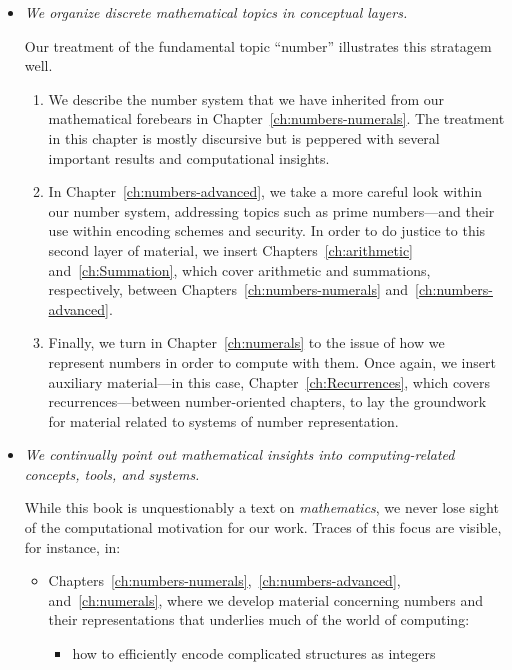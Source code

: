 \begin{itemize}
\item
{\em We organize discrete mathematical topics in conceptual layers.}

Our treatment of the fundamental topic ``number'' illustrates this
stratagem well.
  \begin{enumerate}
  \item
We describe the number system that we have inherited from our
mathematical forebears in Chapter~\ref{ch:numbers-numerals}.  The
treatment in this chapter is mostly discursive but is peppered with
several important results and computational insights.
  \item
In Chapter~\ref{ch:numbers-advanced}, we take a more careful look
within our number system, addressing topics such as prime
numbers---and their use within encoding schemes and security.  In
order to do justice to this second layer of material, we insert
Chapters~\ref{ch:arithmetic} and~\ref{ch:Summation}, which cover
arithmetic and summations, respectively, between
Chapters~\ref{ch:numbers-numerals} and~\ref{ch:numbers-advanced}.
  \item
Finally, we turn in Chapter~\ref{ch:numerals} to the issue of how we
represent numbers in order to compute with them.  Once again, we
insert auxiliary material---in this case,
Chapter~\ref{ch:Recurrences}, which covers recurrences---between
number-oriented chapters, to lay the groundwork for material related
to systems of number representation.
  \end{enumerate}

\item
{\em We continually point out mathematical insights into
 {\em computing-related} concepts, tools, and systems.}

While this book is unquestionably a text on {\em mathematics}, we
never lose sight of the computational motivation for our work.  Traces
of this focus are visible, for instance, in:
  \begin{itemize}
  \item
Chapters~\ref{ch:numbers-numerals},~\ref{ch:numbers-advanced},
and~\ref{ch:numerals}, where we develop material concerning numbers
and their representations that underlies much of the world of
computing:
     \begin{itemize}
     \item
how to efficiently encode complicated structures as integers


\end{itemize}
\end{itemize}
\end{itemize}
